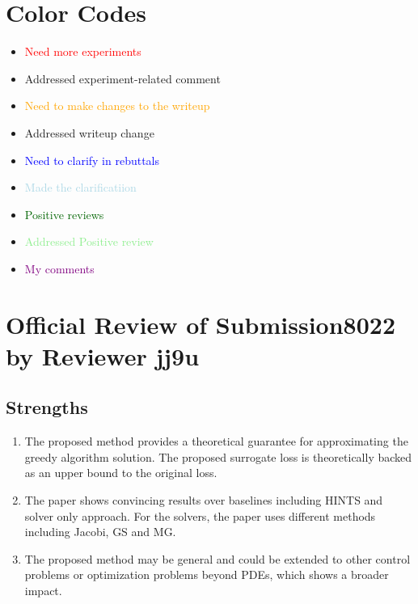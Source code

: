 \documentclass[12pt]{article}
\begin{document}



\section*{Color Codes}

\begin{itemize}
    \item \textcolor{red}{Need more experiments}
    \item \textcolor{lightred}{Addressed experiment-related comment}
    \item \textcolor{orange}{Need to make changes to the writeup}
    \item \textcolor{lightorange}{Addressed writeup change}
    \item \textcolor{blue}{Need to clarify in rebuttals}
    \item \textcolor{lightblue}{Made the clarificatiion}
    \item \textcolor{darkgreen}{Positive reviews}
    \item \textcolor{lightgreen}{Addressed Positive review}
    \item \textcolor{purple}{My comments}
\end{itemize}


\section{Official Review of Submission8022 by Reviewer jj9u}



\subsection*{Strengths}

\begin{enumerate}
    \item The proposed method provides a theoretical guarantee for approximating the greedy algorithm solution. The proposed surrogate loss is theoretically backed as an upper bound to the original loss.
    \item The paper shows convincing results over baselines including HINTS and solver only approach. For the solvers, the paper uses different methods including Jacobi, GS and MG.
    \item The proposed method may be general and could be extended to other control problems or optimization problems beyond PDEs, which shows a broader impact.
\end{enumerate}
\end{document}
